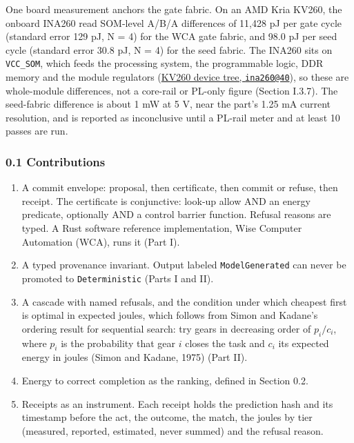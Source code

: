 \documentclass[
  10pt,
]{article}
\providecommand{\tightlist}{%
  \setlength{\itemsep}{0pt}\setlength{\parskip}{0pt}}
\begin{document}
One board measurement anchors the gate fabric. On an AMD Kria KV260, the
onboard INA260 read SOM-level A/B/A differences of 11,428 pJ per gate
cycle (standard error 129 pJ, N = 4) for the WCA gate fabric, and 98.0
pJ per seed cycle (standard error 30.8 pJ, N = 4) for the seed fabric.
The INA260 sits on \texttt{VCC\_SOM}, which feeds the processing system,
the programmable logic, DDR memory and the module regulators
(\href{https://gbmc.googlesource.com/linux/+/ccd1cdca5cd433c8a5dff78b69a79b31d9b77ee1/arch/arm64/boot/dts/xilinx/zynqmp-sck-kv-g-revB.dtso}{KV260
device tree, \texttt{ina260@40}}), so these are whole-module
differences, not a core-rail or PL-only figure (Section I.3.7). The
seed-fabric difference is about 1 mW at 5 V, near the part's 1.25 mA
current resolution, and is reported as inconclusive until a PL-rail
meter and at least 10 passes are run.

\subsubsection{0.1 Contributions}\label{contributions}

\begin{enumerate}
\def\labelenumi{\arabic{enumi}.}
\tightlist
\item
  A commit envelope: proposal, then certificate, then commit or refuse,
  then receipt. The certificate is conjunctive: look-up allow AND an
  energy predicate, optionally AND a control barrier function. Refusal
  reasons are typed. A Rust software reference implementation, Wise
  Computer Automation (WCA), runs it (Part I).
\item
  A typed provenance invariant. Output labeled \texttt{ModelGenerated}
  can never be promoted to \texttt{Deterministic} (Parts I and II).
\item
  A cascade with named refusals, and the condition under which cheapest
  first is optimal in expected joules, which follows from Simon and
  Kadane's ordering result for sequential search: try gears in
  decreasing order of \(p_i / c_i\), where \(p_i\) is the probability
  that gear \(i\) closes the task and \(c_i\) its expected energy in
  joules (Simon and Kadane, 1975) (Part II).
\item
  Energy to correct completion as the ranking, defined in Section 0.2.
\item
  Receipts as an instrument. Each receipt holds the prediction hash and
  its timestamp before the act, the outcome, the match, the joules by
  tier (measured, reported, estimated, never summed) and the refusal
  reason.
\end{enumerate}
\end{document}
